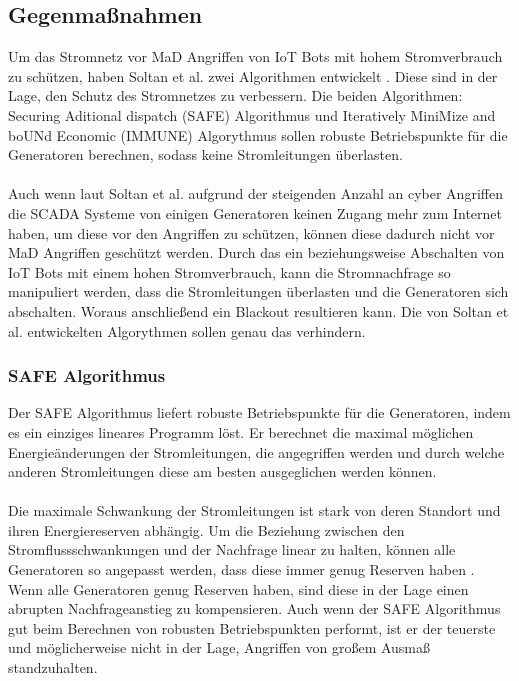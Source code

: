\documentclass[
    a4paper,
    pagesize,
	pdftex,
    12pt,
]{scrartcl}
\begin{document}
\begin{multicols}{2}
\subsection{Gegenmaßnahmen}
Um das Stromnetz vor MaD Angriffen von IoT Bots mit hohem Stromverbrauch zu schützen, haben Soltan et al. zwei Algorithmen entwickelt \cite{soltan2018protecting}. Diese sind in der Lage, den Schutz des Stromnetzes zu verbessern. Die beiden Algorithmen: \glqq Securing Aditional dispatch\grqq{} (SAFE) Algorithmus und \glqq Iteratively MiniMize and boUNd Economic\grqq{} (IMMUNE) Algorythmus sollen robuste Betriebspunkte für die Generatoren berechnen, sodass keine Stromleitungen überlasten. \\ \\ Auch wenn laut Soltan et al. aufgrund der steigenden Anzahl an cyber Angriffen die SCADA Systeme von einigen Generatoren keinen Zugang mehr zum Internet haben, um diese vor den Angriffen zu schützen, können diese dadurch nicht vor MaD Angriffen geschützt werden. Durch das ein beziehungsweise Abschalten von IoT Bots mit einem hohen Stromverbrauch, kann die Stromnachfrage so manipuliert werden, dass die Stromleitungen überlasten und die Generatoren sich abschalten. Woraus anschließend ein Blackout resultieren kann. Die von Soltan et al. entwickelten Algorythmen sollen genau das verhindern.
\subsubsection{SAFE Algorithmus}
Der SAFE Algorithmus liefert robuste Betriebspunkte für die Generatoren, indem es ein einziges lineares Programm löst. Er berechnet die maximal möglichen Energieänderungen der Stromleitungen, die angegriffen werden und durch welche anderen Stromleitungen diese am besten ausgeglichen werden können. \\ \\ Die maximale Schwankung der Stromleitungen ist stark von deren Standort und ihren Energiereserven abhängig. Um die Beziehung zwischen den Stromflussschwankungen und der Nachfrage linear zu halten, können alle Generatoren so angepasst werden, dass diese immer genug Reserven haben \cite{soltan2018protecting}. Wenn alle Generatoren genug Reserven haben, sind diese in der Lage einen abrupten Nachfrageanstieg zu kompensieren. Auch wenn der SAFE Algorithmus gut beim Berechnen von robusten Betriebspunkten performt, ist er der teuerste und möglicherweise nicht in der Lage, Angriffen von großem Ausmaß standzuhalten.

\end{multicols}
\end{document}
